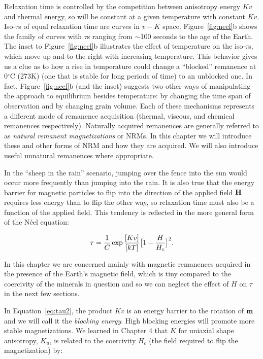  Relaxation time is controlled by the competition between anisotropy energy $Kv$ and thermal energy, so will be constant at a given temperature with constant $Kv$.  Iso-$\tau$s of equal relaxation time are curves in $v-K$ space. Figure~\ref{fig:neel}b shows the family of curves with $\tau$s ranging from $\sim$100 seconds to  the age of the Earth.     The inset to Figure~\ref{fig:neel}b illustrates the effect of temperature on the iso-$\tau$s,  which move up and to the right with increasing temperature.  This  behavior gives us a clue as to how a rise in temperature could change a  ``blocked'' remanence at 0$^{\circ}$C (273K) (one that is stable for long periods of time) to an unblocked  one.    In fact, Figure~\ref{fig:neel}b (and the inset) suggests two other ways of manipulating the approach to equilibrium besides temperature:  by changing the time span of observation  and by changing grain volume.  Each of these mechanisms represents a different mode of remanence acquisition  (thermal, viscous, and chemical remanences respectively).   Naturally acquired remanences are generally referred to as 
{\it natural remanent magnetizations}  or NRMs.  In this chapter we will introduce these and other forms of NRM and how they are acquired.   We will also introduce useful unnatural remanences where appropriate.  
  
  
  
  
  
  
  In the ``sheep in the rain'' scenario, jumping over the fence into the sun would  occur more frequently  than jumping into the rain.  It is also true that the energy barrier for magnetic particles to flip into the direction of the applied field $\hbox{\bf H}$ requires less energy than to flip the other way, so relaxation time must also be a function of the applied field.    This tendency is reflected in the more general form of the N\'eel equation:

\begin{equation}
{\tau} = { { 1\over C} \exp { [Kv] \over [kT]}}{  \bigl[ 1 -  { H\over H_c}\bigr] ^2 }.
\label{eq:tau2}
\end{equation}

\noindent  
In this chapter we are concerned mainly with magnetic remanences acquired in the presence of the Earth's magnetic field, which is tiny compared to the coercivity of the minerals in question and so we can neglect the effect of $H$ on $\tau$ in  the next few sections.  

In Equation~\ref{eq:tau2},   the product $K v$ is an energy barrier to the rotation of $\hbox{\bf m}$ and we will call it  the
{\it  blocking energy}.   High blocking energies will promote more stable magnetizations.    We  learned  in Chapter 4 that $K$ for uniaxial shape anisotropy, $K_u $, is related to the   
 coercivity $H_c$ (the field required to flip the magnetization)  by:
 

